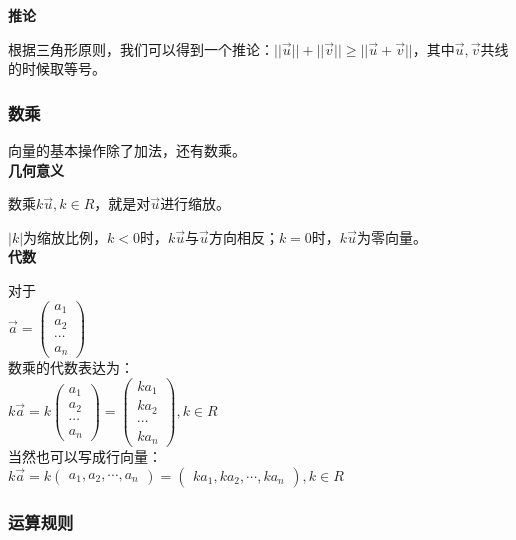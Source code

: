 \documentclass[UTF8]{ctexbook}
\begin{document}
\textbf{推论}

根据三角形原则，我们可以得到一个推论：$||\vec{u}||+||\vec{v}|| \geq ||\vec{u} + \vec{v}||$，其中$\vec{u},\vec{v}$共线的时候取等号。

\subsubsection{数乘}

向量的基本操作除了加法，还有数乘。\\

\textbf{几何意义}

数乘$k\vec{u},k \in R$，就是对$\vec{u}$进行缩放。

$|k|$为缩放比例，$k<0$时，$k\vec{u}$与$\vec{u}$方向相反；$k=0$时，$k\vec{u}$为零向量。\\

\textbf{代数}

对于\\

$\vec{a}=\begin{pmatrix} a_{1} \\ a_{2} \\ \cdots \\ a_{n} \end{pmatrix}$ \\

数乘的代数表达为：\\

$k\vec{a}=k\begin{pmatrix} a_{1} \\ a_{2} \\ \cdots \\ a_{n} \end{pmatrix}
=\begin{pmatrix} ka_{1} \\ ka_{2} \\ \cdots \\ ka_{n} \end{pmatrix},k \in R$\\

当然也可以写成行向量：\\

$k\vec{a}=k\begin{pmatrix} a_{1},a_{2},\cdots,a_{n} \end{pmatrix}=\begin{pmatrix} ka_{1},ka_{2},\cdots,ka_{n} \end{pmatrix},k \in R$

\subsubsection{运算规则}
\end{document}

